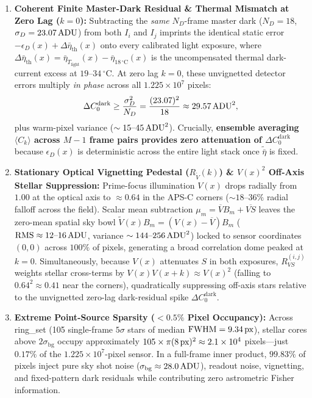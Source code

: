 \documentclass[10pt,twocolumn,letterpaper]{article}
\DeclareRobustCommand{\code}[1]{\texttt{#1}}
\def\code#1{#1}%
\def\bm#1{#1}%
\begin{document}
\begin{enumerate}
  \item \textbf{Coherent Finite Master-Dark Residual \& Thermal Mismatch at Zero Lag ($\bm{k} = \bm{0}$):}
  Subtracting the \emph{same} $N_D$-frame master dark ($N_D = 18$, $\sigma_D = 23.07\text{\,ADU}$) from both $I_i$ and $I_j$ imprints the identical static error $-\epsilon_D(\bm{x}) + \Delta\bar{\eta}_{\text{th}}(\bm{x})$ onto every calibrated light exposure, where $\Delta\bar{\eta}_{\text{th}}(\bm{x}) = \bar{\eta}_{T_{\text{light}}}(\bm{x}) - \bar{\eta}_{18\,^\circ\text{C}}(\bm{x})$ is the uncompensated thermal dark-current excess at $19\text{--}34\,^\circ\text{C}$. At zero lag $\bm{k} = \bm{0}$, these unvignetted detector errors multiply \emph{in phase} across all $1.225 \times 10^7$ pixels:
  \begin{equation}
    \Delta C_{\bm{0}}^{\text{dark}} \ge \frac{\sigma_D^2}{N_D} = \frac{(23.07)^2}{18} \approx 29.57\text{\,ADU}^2,
    \label{eq:dark_zero_lag}
  \end{equation}
  plus warm-pixel variance ($\sim 15\text{--}45\text{\,ADU}^2$). Crucially, \textbf{ensemble averaging $\langle C_{\bm{k}} \rangle$ across $M-1$ frame pairs provides zero attenuation of $\Delta C_{\bm{0}}^{\text{dark}}$} because $\epsilon_D(\bm{x})$ is deterministic across the entire light stack once $\tilde{\bar{\eta}}$ is fixed.

  \item \textbf{Stationary Optical Vignetting Pedestal ($R_{\tilde{V}}(\bm{k})$) \& $V(\bm{x})^2$ Off-Axis Stellar Suppression:}
  Prime-focus illumination $V(\bm{x})$ drops radially from $1.00$ at the optical axis to $\approx 0.64$ in the APS-C corners ($\sim 18\text{--}36\%$ radial falloff across the field). Scalar mean subtraction $\mu_m = \overline{V} B_m + \overline{V S}$ leaves the zero-mean spatial sky bowl $\tilde{V}(\bm{x}) B_m = (V(\bm{x}) - \overline{V}) B_m$ ($\text{RMS} \approx 12\text{--}16\text{\,ADU}$, variance $\sim 144\text{--}256\text{\,ADU}^2$) locked to sensor coordinates $(0, 0)$ across $100\%$ of pixels, generating a broad correlation dome peaked at $\bm{k} = \bm{0}$. Simultaneously, because $V(\bm{x})$ attenuates $S$ in both exposures, $R_{VS}^{(i,j)}$ weights stellar cross-terms by $V(\bm{x})V(\bm{x}+\bm{k}) \approx V(\bm{x})^2$ (falling to $0.64^2 \approx 0.41$ near the corners), quadratically suppressing off-axis stars relative to the unvignetted zero-lag dark-residual spike $\Delta C_{\bm{0}}^{\text{dark}}$.

  \item \textbf{Extreme Point-Source Sparsity ($<0.5\%$ Pixel Occupancy):}
  Across \code{ring\_set} (\code{105} single-frame $5\sigma$ stars of median $\text{FWHM} = 9.34\text{\,px}$), stellar cores above $2\sigma_{\text{bg}}$ occupy approximately $105 \times \pi (8\text{\,px})^2 \approx 2.1 \times 10^4$ pixels---just \textbf{$0.17\%$} of the $1.225 \times 10^7$-pixel sensor. In a full-frame inner product, $99.83\%$ of pixels inject pure sky shot noise ($\sigma_{\text{bg}} \approx 28.0\text{\,ADU}$), readout noise, vignetting, and fixed-pattern dark residuals while contributing zero astrometric Fisher information.


\end{enumerate}
\end{document}
